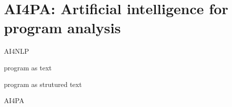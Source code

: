 \section{AI4PA: Artificial intelligence for program analysis}

AI4NLP

program as text

program as strutured text

AI4PA
